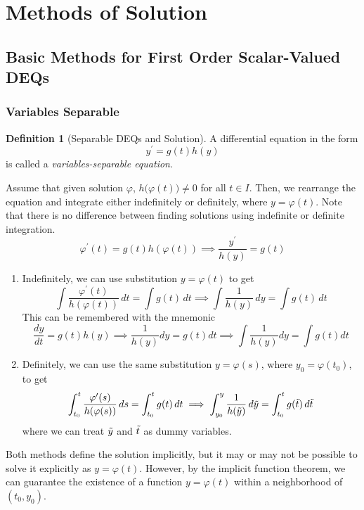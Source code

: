 \documentclass{article}
\theoremstyle{remark}
\theoremstyle{definition}
\newtheorem{definition}{Definition}[section]
\begin{document}
\section{Methods of Solution}

\subsection{Basic Methods for First Order Scalar-Valued DEQs}
\subsubsection{Variables Separable}
\begin{definition}[Separable DEQs and Solution]
A differential equation in the form
\[y^\prime = g(t) h(y)\]
is called a \textit{variables-separable equation}. 

Assume that given solution $\varphi$, $h\big( \varphi(t)\big) \neq 0$ for all $t \in I$. Then, we rearrange the equation and integrate either indefinitely or definitely, where $y = \varphi(t)$. Note that there is no difference between finding solutions using indefinite or definite integration. 
\[\varphi^\prime (t) = g(t) h(\varphi(t)) \implies \frac{y^\prime}{h(y)} = g(t)\]
\begin{enumerate}
    \item Indefinitely, we can use substitution $y = \varphi(t)$ to get
    \[\int \frac{\varphi^\prime (t)}{h(\varphi(t))} \, dt = \int g (t) \, dt \implies \int \frac{1}{h(y)} \,dy = \int g(t)\,dt\]
    This can be remembered with the mnemonic
    \[\frac{dy}{dt} = g(t) h(y) \implies \frac{1}{h(y)} dy = g(t) dt \implies \int \frac{1}{h(y)} dy = \int g(t) dt\]
    \item Definitely, we can use the same substitution $y = \varphi(s)$, where $y_0 = \varphi(t_0)$, to get
    \[\int_{t_0}^t \frac{\varphi^\prime (s)}{h(\varphi(s))} \, ds = \int_{t_0}^t g(t)\, dt \implies \int_{y_0}^y \frac{1}{h(\Tilde{y})} \, d\Tilde{y} = \int_{t_0}^t g(\Tilde{t})\, d\Tilde{t}\]
    where we can treat $\Tilde{y}$ and $\Tilde{t}$ as dummy variables. 
\end{enumerate}
Both methods define the solution implicitly, but it may or may not be possible to solve it explicitly as $y = \varphi(t)$. However, by the implicit function theorem, we can guarantee the existence of a function $y = \varphi(t)$ within a neighborhood of $(t_0, y_0)$. 
\end{definition}
\end{document}
